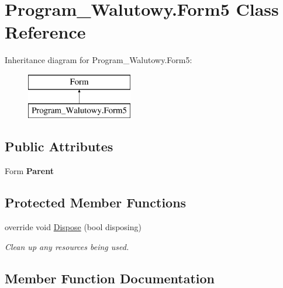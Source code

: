 \hypertarget{class_program___walutowy_1_1_form5}{}\section{Program\+\_\+\+Walutowy.\+Form5 Class Reference}
\label{class_program___walutowy_1_1_form5}
Inheritance diagram for Program\+\_\+\+Walutowy.\+Form5\+:\begin{figure}[H]
\begin{center}
\leavevmode
\includegraphics[height=2.000000cm]{class_program___walutowy_1_1_form5}
\end{center}
\end{figure}
\subsection*{Public Attributes}
\begin{DoxyCompactItemize}
\item 
\mbox{\label{class_program___walutowy_1_1_form5_ae6bae21a3c60e9d7e88ed0ce9d99400b}} 
Form {\bfseries Parent}
\end{DoxyCompactItemize}
\subsection*{Protected Member Functions}
\begin{DoxyCompactItemize}
\item 
override void \mbox{\hyperlink{class_program___walutowy_1_1_form5_ab3f03e7a8d8b2f5917011ac1e9836d4e}{Dispose}} (bool disposing)
\begin{DoxyCompactList}\small\item\em Clean up any resources being used. \end{DoxyCompactList}\end{DoxyCompactItemize}


\subsection{Member Function Documentation}
\mbox{\label{class_program___walutowy_1_1_form5_ab3f03e7a8d8b2f5917011ac1e9836d4e}} 
